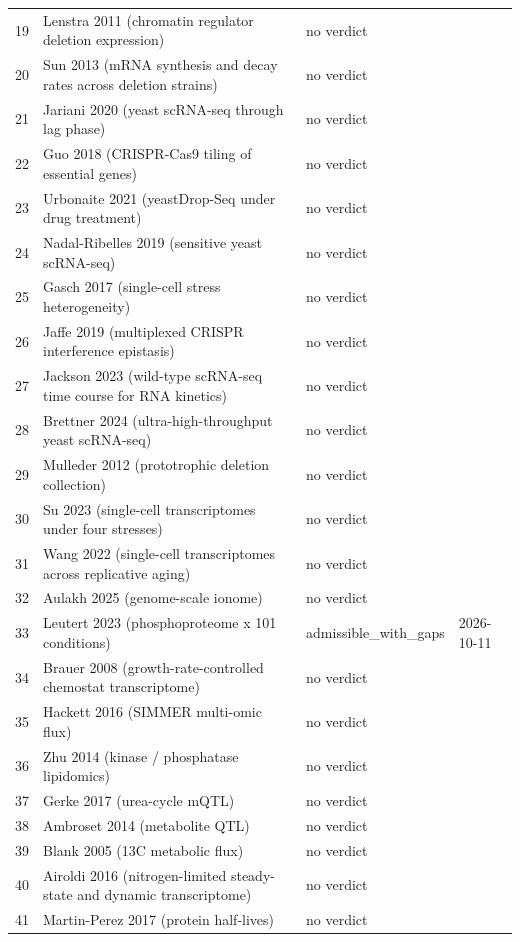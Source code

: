 \begin{longtable}{@{}r L{88mm} L{40mm} L{24mm}@{}}
19 & Lenstra 2011 (chromatin regulator deletion expression) & no verdict &  \\
20 & Sun 2013 (mRNA synthesis and decay rates across deletion strains) & no verdict &  \\
21 & Jariani 2020 (yeast scRNA-seq through lag phase) & no verdict &  \\
22 & Guo 2018 (CRISPR-Cas9 tiling of essential genes) & no verdict &  \\
23 & Urbonaite 2021 (yeastDrop-Seq under drug treatment) & no verdict &  \\
24 & Nadal-Ribelles 2019 (sensitive yeast scRNA-seq) & no verdict &  \\
25 & Gasch 2017 (single-cell stress heterogeneity) & no verdict &  \\
26 & Jaffe 2019 (multiplexed CRISPR interference epistasis) & no verdict &  \\
27 & Jackson 2023 (wild-type scRNA-seq time course for RNA kinetics) & no verdict &  \\
28 & Brettner 2024 (ultra-high-throughput yeast scRNA-seq) & no verdict &  \\
29 & Mulleder 2012 (prototrophic deletion collection) & no verdict &  \\
30 & Su 2023 (single-cell transcriptomes under four stresses) & no verdict &  \\
31 & Wang 2022 (single-cell transcriptomes across replicative aging) & no verdict &  \\
32 & Aulakh 2025 (genome-scale ionome) & no verdict &  \\
33 & Leutert 2023 (phosphoproteome x 101 conditions) & admissible\_with\_gaps & 2026-10-11 \\
34 & Brauer 2008 (growth-rate-controlled chemostat transcriptome) & no verdict &  \\
35 & Hackett 2016 (SIMMER multi-omic flux) & no verdict &  \\
36 & Zhu 2014 (kinase / phosphatase lipidomics) & no verdict &  \\
37 & Gerke 2017 (urea-cycle mQTL) & no verdict &  \\
38 & Ambroset 2014 (metabolite QTL) & no verdict &  \\
39 & Blank 2005 (13C metabolic flux) & no verdict &  \\
40 & Airoldi 2016 (nitrogen-limited steady-state and dynamic transcriptome) & no verdict &  \\
41 & Martin-Perez 2017 (protein half-lives) & no verdict &  \\

\end{longtable}
